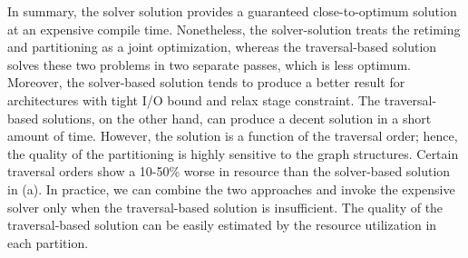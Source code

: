 In summary, the solver solution provides a guaranteed close-to-optimum solution at an expensive
compile time. Nonetheless, the solver-solution treats the retiming and partitioning as a joint optimization,
whereas the traversal-based solution solves these two problems in two separate passes,
which is less optimum.
Moreover, the solver-based solution tends to produce a better result for architectures with tight I/O
bound and relax stage constraint.
The traversal-based solutions, on the other hand, can produce a decent solution in a short amount of
time.
However, the solution is a function of the traversal order; hence, the quality of the partitioning
is highly sensitive to the graph structures.
Certain traversal orders show a 10-50\% worse in resource than the solver-based solution in 
 (a).
In practice, we can combine the two approaches and invoke the expensive solver only when the
traversal-based solution is insufficient. The quality of the traversal-based solution can be easily estimated by the resource utilization in each partition.

